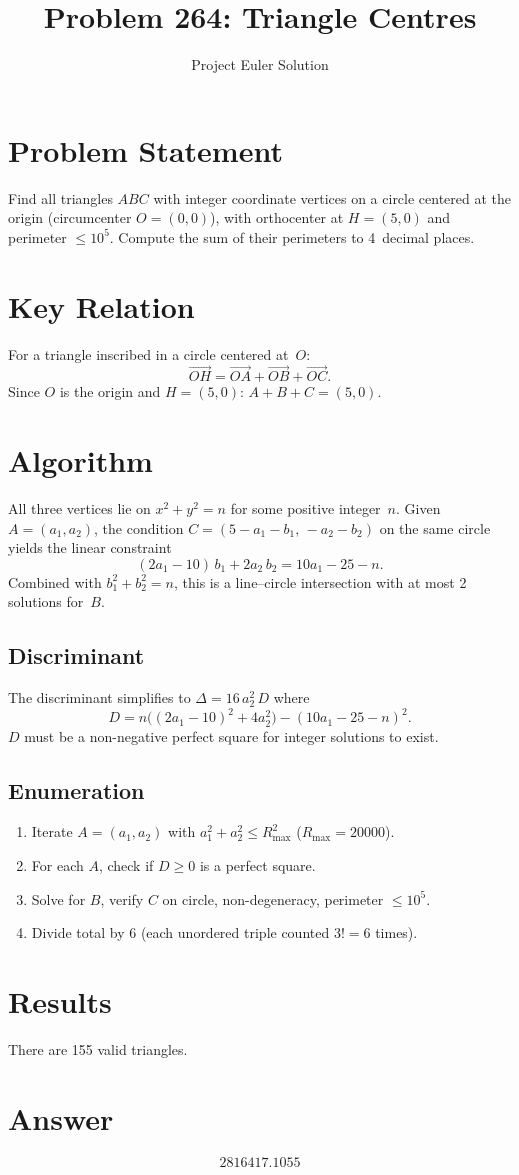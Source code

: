 \documentclass[12pt]{article}
\title{Problem 264: Triangle Centres}
\author{Project Euler Solution}
\date{}
\begin{document}
\maketitle

\section{Problem Statement}

Find all triangles $ABC$ with integer coordinate vertices on a circle centered at the origin (circumcenter $O=(0,0)$), with orthocenter at $H=(5,0)$ and perimeter $\le 10^5$. Compute the sum of their perimeters to 4~decimal places.

\section{Key Relation}

For a triangle inscribed in a circle centered at~$O$:
\[
\vec{OH} = \vec{OA}+\vec{OB}+\vec{OC}.
\]
Since $O$ is the origin and $H=(5,0)$: $A+B+C = (5,0)$.

\section{Algorithm}

All three vertices lie on $x^2+y^2 = n$ for some positive integer~$n$. Given $A=(a_1,a_2)$, the condition $C = (5{-}a_1{-}b_1,\, {-}a_2{-}b_2)$ on the same circle yields the linear constraint
\[
(2a_1{-}10)\,b_1 + 2a_2\,b_2 = 10a_1 - 25 - n.
\]
Combined with $b_1^2+b_2^2=n$, this is a line--circle intersection with at most 2 solutions for~$B$.

\subsection{Discriminant}
The discriminant simplifies to $\Delta = 16\,a_2^2\,D$ where
\[
D = n\bigl((2a_1{-}10)^2 + 4a_2^2\bigr) - (10a_1{-}25{-}n)^2.
\]
$D$ must be a non-negative perfect square for integer solutions to exist.

\subsection{Enumeration}
\begin{enumerate}
\item Iterate $A=(a_1,a_2)$ with $a_1^2+a_2^2 \le R_{\max}^2$ ($R_{\max}=20000$).
\item For each $A$, check if $D\ge 0$ is a perfect square.
\item Solve for $B$, verify $C$ on circle, non-degeneracy, perimeter $\le 10^5$.
\item Divide total by 6 (each unordered triple counted $3!=6$ times).
\end{enumerate}

\section{Results}

There are 155 valid triangles.

\section{Answer}

\[
\boxed{2816417.1055}
\]
\end{document}

